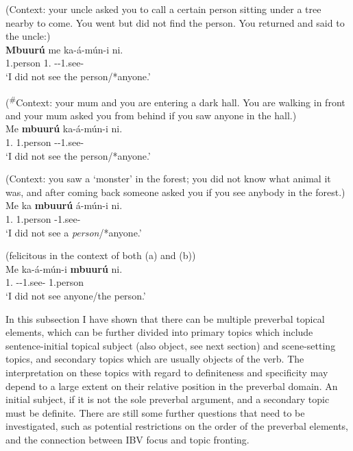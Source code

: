 \documentclass[output=paper,colorlinks,citecolor=brown,
]{langscibook}
\begin{document}
\begin{exe}
     \ex \label{112}
    \begin{xlist}
\ex
\label{112a}
 (Context: your uncle asked you to call a certain person sitting under a tree nearby to come. You went but did not find the person. You returned and said to the uncle:) \\
\gll
\textbf{Mbuurú} me ka-á-mún-i ni.\\
1.person 1\Sg{}.\Pro{} \Neg{}-\Pst{}-1\Sg{}.see-\Pst{} \Neg{}\\
\trans ‘I did not see the person/*anyone.’

\ex
\label{112b}
 (\textsuperscript{\#}Context: your mum and you are entering a dark hall. You are walking in front and your mum asked you from behind if you saw anyone in the hall.) \\
\gll
Me \textbf{mbuurú} ka-á-mún-i ni.\\
1\Sg{}.\Pro{} 1.person \Neg{}-\Pst{}-1\Sg{}.see-\Pst{} \Neg{}\\
\trans ‘I did not see the person/*anyone.’

\ex
\label{112c}
 (Context: you saw a `monster' in the forest; you did not know what animal it was, and after coming back someone asked you if you see anybody in the forest.) \\
\gll
Me ka \textbf{mbuurú} á-mún-i ni.\\
1\Sg{}.\Pro{} \Neg{} 1.person \Pst{}-1\Sg{}.see-\Pst{} \Neg{}\\
\trans ‘I did not see a \textit{person}/*anyone.’

\ex
\label{112d}
 (felicitous in the context of both (a) and (b)) \\
\gll
Me ka-á-mún-i \textbf{mbuurú} ni.\\
1\Sg{}.\Pro{} \Neg{}-\Pst{}-1\Sg{}.see-\Pst{} 1.person \Neg{}\\
\trans ‘I did not see anyone/the person.’

    \end{xlist}
\end{exe}
In this subsection I have shown that there can be multiple preverbal topical elements, which can be further divided into primary topics which include sentence-initial topical subject (also object, see next section) and scene-setting topics, and secondary topics which are usually objects of the verb. The interpretation on these topics with regard to definiteness and specificity may depend to a large extent on their relative position in the preverbal domain. An initial subject, if it is not the sole preverbal argument, and a secondary topic must be definite. There are still some further questions that need to be investigated, such as potential restrictions on the order of the preverbal elements, and the connection between IBV focus and topic fronting.
\end{document}
